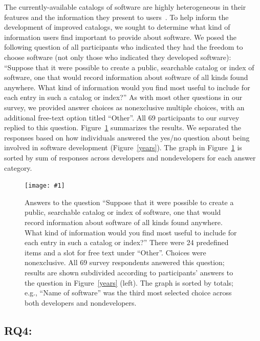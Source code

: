 \documentclass[review]{elsarticle}
\newcommand{\totalRespondents}{69\xspace}
\newcommand{\includefile}[1]{\texttt{[image: \#1]}}
\begin{document}
The currently-available catalogs of software are highly heterogeneous in their features and the information they present to users~\citep[e.g.,][]{nasa2016software, hempel2016xsede, darpa2015open, allen_2012, noy2009bioportal, hucka2016software, gleeson2016current, browne1995netlib, bonisch_2013}.  To help inform the development of improved catalogs, we sought to determine what kind of information users find important to provide about software.  We posed the following question of all participants who indicated they had the freedom to choose software (not only those who indicated they developed software): ``Suppose that it were possible to create a public, searchable catalog or index of software, one that would record information about software of all kinds found anywhere.  What kind of information would you find most useful to include for each entry in such a catalog or index?''  As with most other questions in our survey, we provided answer choices as nonexclusive multiple choices, with an additional free-text option titled ``Other''.  All \totalRespondents participants to our survey replied to this question.  Figure~\ref{info-to-include} summarizes the results.  We separated the responses based on how individuals answered the yes/no question about being involved in software development (Figure~\ref{years}).  The graph in Figure~\ref{info-to-include} is sorted by sum of responses across developers and nondevelopers for each answer category.

\begin{figure}[tbh]
  \centering
  \includefile{files/plots/info-to-include-in-index-v5.pdf}
  \caption{Answers to the question ``Suppose that it were possible to create a public, searchable catalog or index of software, one that would record information about software of all kinds found anywhere. What kind of information would you find most useful to include for each entry in such a catalog or index?'' There were 24 predefined items and a slot for free text under ``Other''.  Choices were nonexclusive.  All 69 survey respondents answered this question; results are shown subdivided according to participants' answers to the question in Figure~\ref{years} (left).  The graph is sorted by totals; e.g., ``Name of software'' was the third most selected choice across both developers and nondevelopers.}
  \label{info-to-include}
\end{figure}

\clearpage


\subsection{RQ4: \rqfourtext}
\label{results-rqfour}
\end{document}
